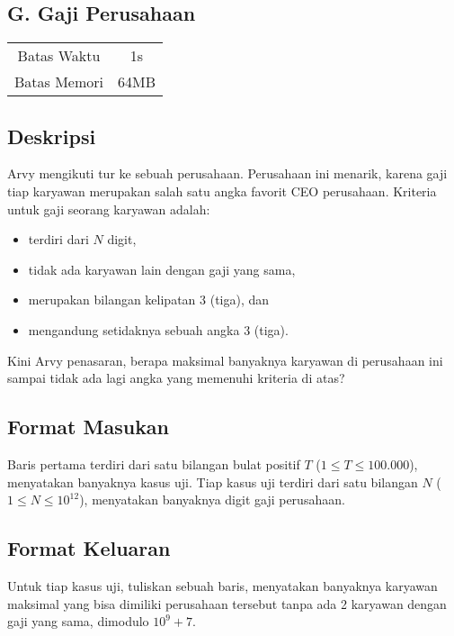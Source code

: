 \documentclass{article}
\begin{document}
\begin{center}
    \section*{G. Gaji Perusahaan} %

    \begin{tabular}{ | c c | }
        \hline
        Batas Waktu  & 1s \\    %
        Batas Memori & 64MB \\  %
        \hline
    \end{tabular}
\end{center}

\subsection*{Deskripsi}

Arvy mengikuti tur ke sebuah perusahaan.
Perusahaan ini menarik, karena gaji tiap karyawan merupakan salah satu angka favorit CEO perusahaan.
Kriteria untuk gaji seorang karyawan adalah:
\begin{itemize}
    \item terdiri dari $N$ digit,
    \item tidak ada karyawan lain dengan gaji yang sama,
    \item merupakan bilangan kelipatan 3 (tiga), dan
    \item mengandung setidaknya sebuah angka 3 (tiga).
\end{itemize}
Kini Arvy penasaran, berapa maksimal banyaknya karyawan di perusahaan ini sampai tidak ada lagi angka yang memenuhi kriteria di atas?

\subsection*{Format Masukan}

Baris pertama terdiri dari satu bilangan bulat positif $T$ ($1 \leq T \leq 100.000$), menyatakan banyaknya kasus uji.
Tiap kasus uji terdiri dari satu bilangan $N$ ($1 \leq N \leq 10^{12}$), menyatakan banyaknya digit gaji perusahaan.

\subsection*{Format Keluaran}

Untuk tiap kasus uji, tuliskan sebuah baris, menyatakan banyaknya karyawan maksimal yang bisa dimiliki perusahaan tersebut tanpa ada 2 karyawan dengan gaji yang sama, dimodulo ${10}^9+7$.
\\
\end{document}

